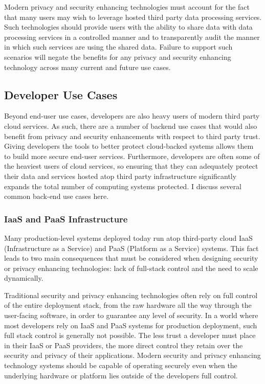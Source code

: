 Modern privacy and security enhancing technologies must account for
the fact that many users may wish to leverage hosted third party data
processing services. Such technologies should provide users with the
ability to share data with data processing services in a controlled
manner and to transparently audit the manner in which such services
are using the shared data. Failure to support such scenarios will
negate the benefits for any privacy and security enhancing technology
across many current and future use cases.

\subsection{Developer Use Cases}

Beyond end-user use cases, developers are also heavy users of modern
third party cloud services. As such, there are a number of backend use
cases that would also benefit from privacy and security enhancements
with respect to third party trust. Giving developers the tools to
better protect cloud-backed systems allows them to build more secure
end-user services. Furthermore, developers are often some of the
heaviest users of cloud services, so ensuring that they can adequately
protect their data and services hosted atop third party infrastructure
significantly expands the total number of computing systems
protected. I discuss several common back-end use cases here.

\subsubsection{IaaS and PaaS Infrastructure}

Many production-level systems deployed today run atop third-party
cloud IaaS (Infrastructure as a Service) and PaaS (Platform as a
Service) systems. This fact leads to two main consequences that must
be considered when designing security or privacy enhancing
technologies: lack of full-stack control and the need to scale
dynamically.

Traditional security and privacy enhancing technologies often rely on
full control of the entire deployment stack, from the raw hardware all
the way through the user-facing software, in order to guarantee any
level of security. In a world where most developers rely on IaaS and
PaaS systems for production deployment, such full stack control is
generally not possible. The less trust a developer must place in their
IaaS or PaaS providers, the more direct control they retain over the
security and privacy of their applications. Modern security and
privacy enhancing technology systems should be capable of operating
securely even when the underlying hardware or platform lies outside of
the developers full control.

